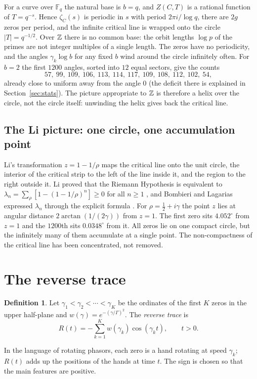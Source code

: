 \documentclass[11pt,a4paper]{article}
\theoremstyle{definition}\newtheorem{definition}[proposition]{Definition}
\theoremstyle{remark}\newtheorem{remark}[proposition]{Remark}
\begin{document}
For a curve over $\mathbb F_q$ the natural base is $b=q$, and $Z(C,T)$ is a rational function of $T=q^{-s}$. Hence $\zeta_C(s)$ is periodic in $s$ with period $2\pi i/\log q$, there are $2g$ zeros per period, and the infinite critical line is wrapped onto the circle $|T|=q^{-1/2}$. Over $\mathbb Z$ there is no common base: the orbit lengths $\log p$ of the primes are not integer multiples of a single length. The zeros have no periodicity, and the angles $\gamma_k\log b$ for any fixed $b$ wind around the circle infinitely often. For $b=2$ the first $1200$ angles, sorted into $12$ equal sectors, give the counts
\[
57,\ 99,\ 109,\ 106,\ 113,\ 114,\ 117,\ 109,\ 108,\ 112,\ 102,\ 54,
\]
already close to uniform away from the angle $0$ (the deficit there is explained in Section~\ref{sec:stats}). The picture appropriate to $\mathbb Z$ is therefore a helix over the circle, not the circle itself: unwinding the helix gives back the critical line.

\subsection{The Li picture: one circle, one accumulation point}
Li's transformation $z=1-1/\rho$ maps the critical line onto the unit circle, the interior of the critical strip to the left of the line inside it, and the region to the right outside it. Li proved that the Riemann Hypothesis is equivalent to $\lambda_n=\sum_\rho[1-(1-1/\rho)^n]\ge0$ for all $n\ge1$ \cite{Li1997}, and Bombieri and Lagarias expressed $\lambda_n$ through the explicit formula \cite{BombieriLagarias1999}. For $\rho=\tfrac12+i\gamma$ the point $z$ lies at angular distance $2\arctan(1/(2\gamma))$ from $z=1$. The first zero sits $4.052^\circ$ from $z=1$ and the $1200$th sits $0.0348^\circ$ from it. All zeros lie on one compact circle, but the infinitely many of them accumulate at a single point. The non-compactness of the critical line has been concentrated, not removed.

\section{The reverse trace}\label{sec:reverse}
\begin{definition}
Let $\gamma_1<\gamma_2<\cdots<\gamma_K$ be the ordinates of the first $K$ zeros in the upper half-plane and $w(\gamma)=e^{-(\gamma/\Gamma)^2}$. The \emph{reverse trace} is
\[
R(t)=-\sum_{k=1}^{K}w(\gamma_k)\cos(\gamma_k t),\qquad t>0.
\]
\end{definition}
In the language of rotating phasors, each zero is a hand rotating at speed $\gamma_k$; $R(t)$ adds up the positions of the hands at time $t$. The sign is chosen so that the main features are positive.
\end{document}
